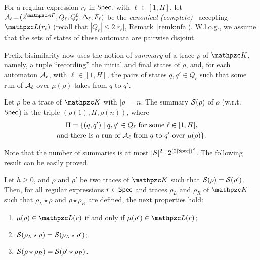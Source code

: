 For a regular expression $r_\ell$ in $\textsf{Spec}$, with $\ell\!\in\! [1,H]$, let $\Au_\ell\!=\!\tpl{2^{\Prop},Q_\ell,Q_\ell^{0},\Delta_\ell,F_\ell}$ be the \emph{canonical (complete)} \NFA\ accepting $\Lang(r_\ell)$ (recall that
$|Q_\ell|\leq 2|r_\ell|$, Remark~\ref{remk:nfa}).
W.l.o.g., we assume that the sets of states of these automata are pairwise disjoint.  %

Prefix bisimilarity now uses the notion of \emph{summary}  of a trace $\rho$ of $\Ku$, namely, a tuple ``recording'' the initial and final states of $\rho$, and, for each automaton $\mathcal{A}_\ell$, with $\ell\in [1,H]$, the pairs of states $q,q'\in Q_\ell$  such that some run of $\mathcal{A}_\ell$ over $\mu(\rho)$ takes from $q$ to $q'$.

\begin{definition}
Let $\rho$ be a trace of $\Ku$ with $|\rho|=n$. The summary $\mathcal{S}(\rho)$ of $\rho$ (w.r.t.\ $\textsf{Spec}$) is the triple
$(\rho(1),\Pi,\rho(n))$, where 
\begin{multline*}
\Pi=\{(q,q')\mid q,q'\in Q_\ell \text{ for some } \ell\in [1,H], \\ \text{and there is a run of $\mathcal{A}_\ell$ from $q$ to $q'$ over $\mu(\rho)$}\}.
\end{multline*}
\end{definition}
%
Note that the number of summaries is at most $|S|^2\cdot 2^{(2|\textsf{Spec}|)^2}$. The following result can be easily proved.

\begin{proposition}\label{prop:Summaries} Let $h\geq 0$, and $\rho$ and $\rho'$ be two traces of  $\Ku$ such that $\mathcal{S}(\rho)=\mathcal{S}(\rho')$. Then, for all regular expressions $r\in \textsf{Spec}$ and traces $\rho_L$ and $\rho_R$ of $\Ku$ such that $\rho_L \star \rho$ and  $\rho \star \rho_R$ are defined, the next properties hold:
\begin{enumerate}
    \item $\mu(\rho)\in\Lang(r)$ if and only if $\mu(\rho')\in\Lang(r)$;
    \item $\mathcal{S}(\rho_L\star \rho)=\mathcal{S}(\rho_L\star \rho')$;
    \item $\mathcal{S}(\rho\star \rho_R)=\mathcal{S}(\rho'\star \rho_R)$.
\end{enumerate}
\end{proposition}

